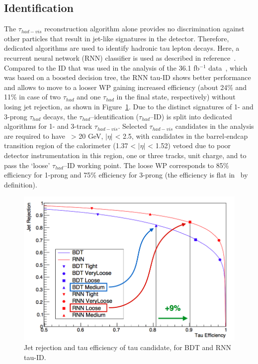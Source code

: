 \subsection{Identification}
The $\tau_{had-vis}$ reconstruction algorithm alone provides 
no discrimination against other particles that result in
jet-like signatures in the detector. 
Therefore, dedicated algorithms are used to identify hadronic tau lepton
decays. Here, a recurrent neural network (RNN) classifier 
is used as described in reference~\cite{ATL-PHYS-PUB-2019-033}.
Compared to the ID that was used in the analysis of the 36.1 fb$^{-1}$ data~\cite{HIGG-2016-16},
which was based on a boosted decision tree, 
the RNN tau-ID shows better performance 
and allows to move to a looser WP gaining increased efficiency 
(about 24\% and 11\% in case of two $\tau_{had}$ and 
one $\tau_{had}$ in the final state, respectively) 
without losing jet rejection, as shown in Figure~\ref{fig:RNNtau}. 
Due to the distinct signatures of 1- and 3-prong $\tau_{had}$ decays, 
the $\tau_{had}$--identification ($\tau_{had}$--ID) is split into dedicated
algorithms for 1- and 3-track $\tau_{had-vis}$.
Selected $\tau_{had-vis}$ candidates in the analysis are required to have 
\pt\ > 20 GeV, $|\eta|$ < 2.5, with candidates in the barrel-endcap 
transition region of the calorimeter (1.37 < $|\eta|$ < 1.52) vetoed 
due to poor detector instrumentation in this region, 
one or three tracks, unit charge, and to pass the ‘loose’ $\tau_{had}$--ID working point.
The loose WP corresponds to 85\% efficiency for 1-prong 
and 75\% efficiency for 3-prong (the efficiency is
flat in \pt\ by definition).
\begin{figure}[bth]
	\begin{centering}	
	\includegraphics[width=.9\textwidth]{Reconstruction_plots/tauRNN.png}
	\caption{Jet rejection and tau efficiency of tau candidate, for BDT and
    RNN tau-ID.}
	\label{fig:RNNtau}
	\end{centering}
\end{figure}

